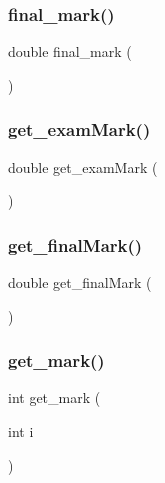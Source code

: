 \subsubsection{\texorpdfstring{final\+\_\+mark()}{final\_mark()}}
{\footnotesize\ttfamily double final\+\_\+mark (\begin{DoxyParamCaption}{ }\end{DoxyParamCaption})}

\mbox{\label{classStudent_ab996e975f082192a02077a8c5665aa25}} 
\subsubsection{\texorpdfstring{get\+\_\+exam\+Mark()}{get\_examMark()}}
{\footnotesize\ttfamily double get\+\_\+exam\+Mark (\begin{DoxyParamCaption}{ }\end{DoxyParamCaption})\hspace{0.3cm}{\ttfamily [inline]}}

\mbox{\label{classStudent_a227227aa7b579cc83a3e0d37bd309e59}} 
\subsubsection{\texorpdfstring{get\+\_\+final\+Mark()}{get\_finalMark()}}
{\footnotesize\ttfamily double get\+\_\+final\+Mark (\begin{DoxyParamCaption}{ }\end{DoxyParamCaption})\hspace{0.3cm}{\ttfamily [inline]}}

\mbox{\label{classStudent_a94ee4d5b4ddd8e4b2ac5204453fb1f6d}} 
\subsubsection{\texorpdfstring{get\+\_\+mark()}{get\_mark()}}
{\footnotesize\ttfamily int get\+\_\+mark (\begin{DoxyParamCaption}\item[{int}]{i }\end{DoxyParamCaption})\hspace{0.3cm}{\ttfamily [inline]}}

